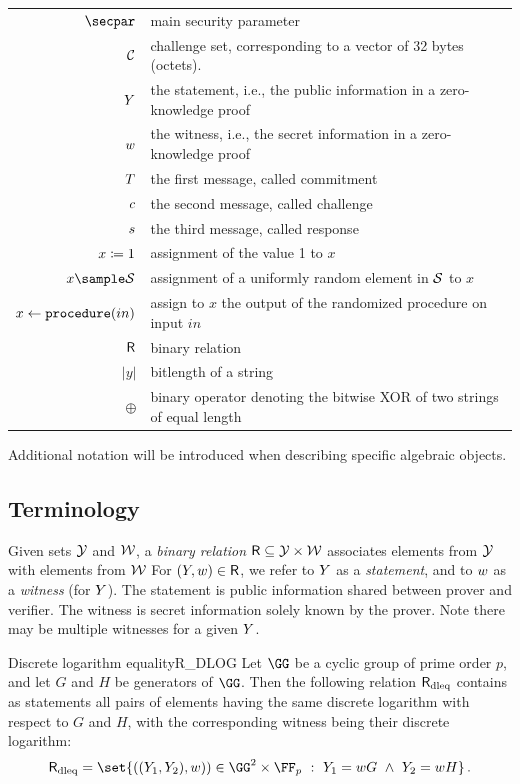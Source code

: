\documentclass[11pt]{article}
\begin{document}
\begin{tabular}{r@{\hspace{1em}}p{11cm}}
    $\secpar$ & main security parameter\\
    $\mathcal{C}$ & challenge set, corresponding to a vector of 32 bytes (octets).\\
    $Y$ & the statement, i.e., the public information in a zero-knowledge proof \\
    $w$ & the witness, i.e., the secret information in a zero-knowledge proof \\
    $T$ & the first message, called commitment \\
    $c$ & the second message, called challenge \\
    $s$ & the third message, called response \\
    $x \coloneqq 1$ & assignment of the value 1 to $x$\\
    $x\sample\someset$ & assignment of a uniformly random element in $\mathcal{S}$ to $x$\\
    $x\gets\texttt{procedure}(in)$ & assign to $x$ the output of the randomized procedure on input $in$\\
    $\mathsf{R}$ & binary relation\\
    $|y|$ & bitlength of a string \\
    $\oplus$ & binary operator denoting the bitwise XOR of two strings of equal length
\end{tabular}

Additional notation will be introduced when describing specific algebraic objects.
\subsection{Terminology}
Given sets $\mathcal{Y}$ and $\mathcal{W}$,
a \emph{binary relation} $\mathsf{R} \subseteq \mathcal{Y} \times \mathcal{W}$ associates elements from $\mathcal{Y}$ with elements from $\mathcal{W}$
For $(Y,w)\in\mathsf{R}$, we refer to $Y$ as a \emph{statement}, and to $w$ as a \emph{witness} (for $Y$).
The statement is public information shared between prover and verifier.
The witness is secret information solely known by the prover.
Note there may be multiple witnesses for a given $Y$.

\begin{example}{Discrete logarithm equality}{R_DLOG}
  Let $\GG$ be a cyclic group of prime order $p$, and let $G$ and $H$ be generators of $\GG$.
	Then the following relation $\mathsf{R}_{\operatorname{dleq}}$ contains as statements all pairs of elements having the same discrete logarithm with respect to $G$ and $H$, with the corresponding witness being their discrete logarithm:
  $$
	  \dleqrelation = \set{\left((\statement_1,\statement_2),\witness)\right) \in \GG^2\times \FF_p~:~\statement_1=\witness G ~\land~ \statement_2=\witness H}\,.
	$$
\end{example}
\end{document}
